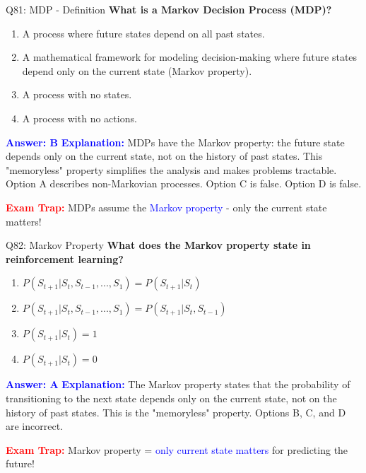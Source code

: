 \documentclass[8pt]{beamer}
\begin{document}
	\begin{frame}{Q81: MDP - Definition}
		\fontsize{6.5}{7.5}\selectfont
		\textbf{What is a Markov Decision Process (MDP)?}
		
		\begin{enumerate}
			\item A process where future states depend on all past states.
			\item A mathematical framework for modeling decision-making where future states depend only on the current state (Markov property).
			\item A process with no states.
			\item A process with no actions.
		\end{enumerate}
		
		\vspace{0.1cm}
		\textcolor{blue}{\textbf{Answer: B}}
		\vspace{0.1cm}
		\textcolor{blue}{\textbf{Explanation:}} MDPs have the Markov property: the future state depends only on the current state, not on the history of past states. This "memoryless" property simplifies the analysis and makes problems tractable. Option A describes non-Markovian processes. Option C is false. Option D is false.
		
		\textcolor{red}{\textbf{Exam Trap:}} MDPs assume the \textcolor{blue}{Markov property} - only the current state matters!
	\end{frame}
	
	\begin{frame}{Q82: Markov Property}
		\fontsize{6.5}{7.5}\selectfont
		\textbf{What does the Markov property state in reinforcement learning?}
		
		\begin{enumerate}
			\item $P(S_{t+1} | S_t, S_{t-1}, ..., S_1) = P(S_{t+1} | S_t)$
			\item $P(S_{t+1} | S_t, S_{t-1}, ..., S_1) = P(S_{t+1} | S_t, S_{t-1})$
			\item $P(S_{t+1} | S_t) = 1$
			\item $P(S_{t+1} | S_t) = 0$
		\end{enumerate}
		
		\vspace{0.1cm}
		\textcolor{blue}{\textbf{Answer: A}}
		\vspace{0.1cm}
		\textcolor{blue}{\textbf{Explanation:}} The Markov property states that the probability of transitioning to the next state depends only on the current state, not on the history of past states. This is the "memoryless" property. Options B, C, and D are incorrect.
		
		\textcolor{red}{\textbf{Exam Trap:}} Markov property = \textcolor{blue}{only current state matters} for predicting the future!
	\end{frame}
	
\end{document}

